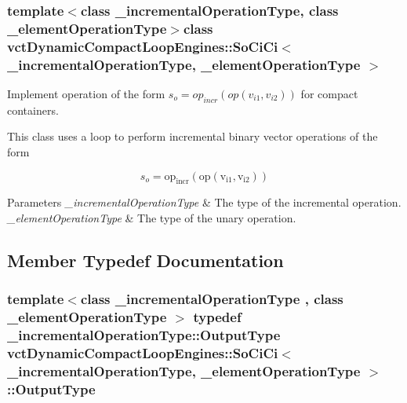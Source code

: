 \subsubsection*{template$<$class \-\_\-incremental\-Operation\-Type, class \-\_\-element\-Operation\-Type$>$class vct\-Dynamic\-Compact\-Loop\-Engines\-::\-So\-Ci\-Ci$<$ \-\_\-incremental\-Operation\-Type, \-\_\-element\-Operation\-Type $>$}

Implement operation of the form $s_o = op_{incr}(op(v_{i1}, v_{i2}))$ for compact containers. 

This class uses a loop to perform incremental binary vector operations of the form

\[ s_o = \mathrm{op_{incr}(\mathrm{op}(v_{i1}, v_{i2}))} \]


\begin{DoxyParams}{Parameters}
{\em \-\_\-incremental\-Operation\-Type} & The type of the incremental operation.\\
\hline
{\em \-\_\-element\-Operation\-Type} & The type of the unary operation. \\
\hline
\end{DoxyParams}


\subsection{Member Typedef Documentation}
\hypertarget{classvct_dynamic_compact_loop_engines_1_1_so_ci_ci_ab00f75cd43ad2aa4ca177a1522f73fe2}{
\subsubsection[{Output\-Type}]{\setlength{\rightskip}{0pt plus 5cm}template$<$class \-\_\-incremental\-Operation\-Type , class \-\_\-element\-Operation\-Type $>$ typedef \-\_\-incremental\-Operation\-Type\-::\-Output\-Type {\bf vct\-Dynamic\-Compact\-Loop\-Engines\-::\-So\-Ci\-Ci}$<$ \-\_\-incremental\-Operation\-Type, \-\_\-element\-Operation\-Type $>$\-::{\bf Output\-Type}}}\label{classvct_dynamic_compact_loop_engines_1_1_so_ci_ci_ab00f75cd43ad2aa4ca177a1522f73fe2}


